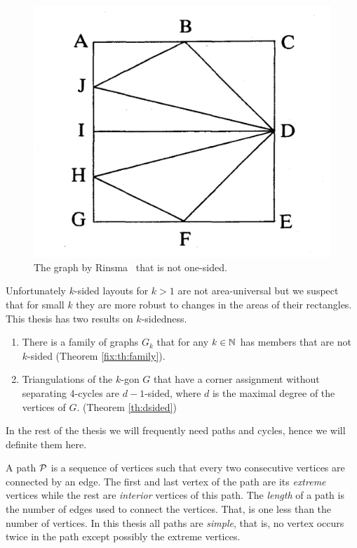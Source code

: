   \begin{figure}[!t]
    \centering
    \includegraphics[scale=.15]{introduction/img/rinsma.png}
    \caption{The graph by Rinsma~\cite{Rinsma1987} that is not one-sided.}
    \label{fig:intro:rinsma}
  \end{figure}

  Unfortunately $k$-sided layouts for $k>1$ are not area-universal but we suspect that for small $k$ they are more robust to changes in the areas of their rectangles. This thesis has two results on $k$-sidedness.
  \begin{enumerate}
    \item There is a family of graphs $G_k$ that for any $k \in \N$ has members that are not $k$-sided (Theorem \ref{fix:th:family}).
    \item Triangulations of the $k$-gon $G$ that have a corner assignment without separating 4-cycles are $d-1$-sided, where $d$ is the maximal degree of the vertices of $G$. (Theorem \ref{th:dsided})
  \end{enumerate}


  In the rest of the thesis we will frequently need paths and cycles, hence we will definite them here.

  A path $\P$ is a sequence of vertices such that every two consecutive vertices are connected by an edge. The first and last vertex of the path are its \emph{extreme} vertices while the rest are \emph{interior} vertices of this path. The \emph{length} of a path is the number of edges used to connect the vertices. That, is one less than the number of vertices. In this thesis all paths are \emph{simple}, that is, no vertex occurs twice in the path except possibly the extreme vertices.

